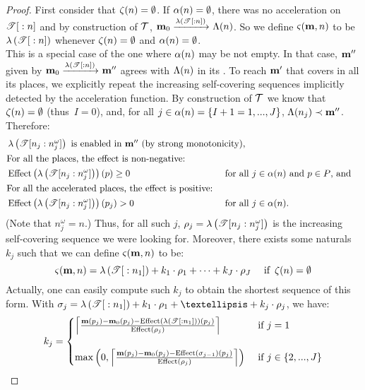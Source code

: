 \begin{proof}
  First consider that $\operatorname{\zeta}(n) = \emptyset$.
  If $\operatorname{\alpha}(n) = \emptyset$, there was no acceleration on ${\mathscr{T}}[{}:{n}]$ and by construction of $\mathcal{T}$, $\mathbf{m}_0 \xrightarrow{\operatorname{\lambda}\left({{\mathscr{T}}[{}:{n}]}\right)}_{} \operatorname{\Lambda}(n)$.
  So we define $\operatorname{\varsigma}(\mathbf{m},n)$ to be $\operatorname{\lambda}\left({{\mathscr{T}}[{}:{n}]}\right)$ whenever $\operatorname{\zeta}(n) = \emptyset$ and $\operatorname{\alpha}(n) = \emptyset$.\\
  This is a special case of the one where $\operatorname{\alpha}(n)$ may be not empty.
  In that case, $\mathbf{m}''$ given by $\mathbf{m}_0 \xrightarrow{\operatorname{\lambda}\left({{\mathscr{T}}[{}:{n}]}\right)}_{} \mathbf{m}''$ agrees with $\operatorname{\Lambda}(n)$ in its \noplaces.
  To reach $\mathbf{m}'$ that covers \mar in all its places, we explicitly repeat the increasing self-covering sequences implicitly detected by the acceleration function.
  By construction of $\mathcal{T}$ we know that $\operatorname{\zeta}(n) = \emptyset$ (thus~$I = 0$), and, for all $j \in \operatorname{\alpha}(n) = \{I+1 = 1, ..., J\}$, $\operatorname{\Lambda}(n_j) \prec \mathbf{m}''$.
  Therefore:
  \begin{align*}
    &\makebox[0pt][l]{\,\(\labt{\treepath[n_j]{n^\omega_j}}\text{ is enabled in }\mar''\text{ (by strong monotonicity), }\)} \\
    &\text{For all the places, the effect is non-negative:}\\
    &\effect{\labt{\treepath[n_j]{n^\omega_j}}}(p) \geq 0 &&\text{ for all }j \in \na{n}\text{ and }p \in \places \text{, and} \\
    &\text{For all the accelerated places, the effect is positive:}\\
    &\effect{\labt{\treepath[n_j]{n^\omega_j}}}(p_j) > 0  &&\text{ for all }j \in \na{n} \text{.}
  \end{align*}
  (Note that $n^\omega_j = n$.)
  Thus, for all such $j$, $\iscs{j} = \labt{\treepath[n_j]{n^\omega_j}}$ is the increasing self-covering sequence we were looking for.
  Moreover, %
  there exists some naturals $k_j$ such that we can define $\operatorname{\varsigma}(\mathbf{m},n)$ to be:
  \[ \tts{\mar}{n} = \labt{\treepath{n_1}} + k_1 \cdot \iscs{1} + \dots + k_J \cdot \iscs{J} \quad\text{ if }\ab{n} = \emptyset \]
  Actually, one can easily compute such $k_j$ to obtain the shortest sequence of this form.
  With $\seqt_j = \labt{\treepath{n_1}} + k_1 \cdot \iscs{1} + … + k_j \cdot \iscs{j}$, we have:
  \[
    k_j =
    \begin{cases}
      \left\lceil
        \frac{\mar(p_j) - \mari(p_j) - \effect{\labt{\treepath{n_1}}}(p_j)}
             {\effect{\iscs{j}}}
      \right\rceil
      &\text{ if } j = 1\\
      \\
      \max\left(0,
        \left\lceil
          \frac{\mar(p_j) - \mari(p_j) - \effect{\seqt_{j-1}}(p_j)}
              {\effect{\iscs{j}}}
        \right\rceil
      \right)
      &\text{ if } j \in \{2, ..., J\}
    \end{cases}
  \]


\end{proof}
